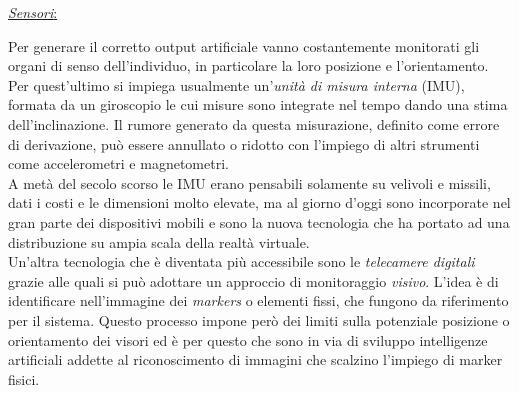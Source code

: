 \begin{flushleft}
	\underline{\textit{Sensori}:}
\end{flushleft}  Per generare il corretto output artificiale vanno costantemente monitorati gli organi di senso dell'individuo, in particolare la loro posizione e l'orientamento. Per quest'ultimo si impiega usualmente un'\textit{unità di misura interna} (IMU), formata da un giroscopio le cui misure sono integrate nel tempo dando una stima dell'inclinazione. Il rumore generato da questa misurazione, definito come errore di derivazione, può essere annullato o ridotto con l'impiego di altri strumenti come accelerometri e magnetometri.\\
A metà del secolo scorso le IMU erano pensabili solamente su velivoli e missili, dati i costi e le dimensioni molto elevate, ma al giorno d'oggi sono incorporate nel gran parte dei dispositivi mobili e sono la nuova tecnologia che ha portato ad una distribuzione su ampia scala della realtà virtuale.\\
Un'altra tecnologia che è diventata più accessibile sono le \textit{telecamere digitali} grazie alle quali si può adottare un approccio di monitoraggio \textit{visivo}.
L'idea è di identificare nell'immagine dei \textit{markers} o elementi fissi, che fungono da riferimento per il sistema. Questo processo impone però dei limiti sulla potenziale posizione o orientamento dei visori ed è per questo che sono in via di sviluppo intelligenze artificiali addette al riconoscimento di immagini che scalzino l'impiego di marker fisici.

\vspace{0.2cm}

